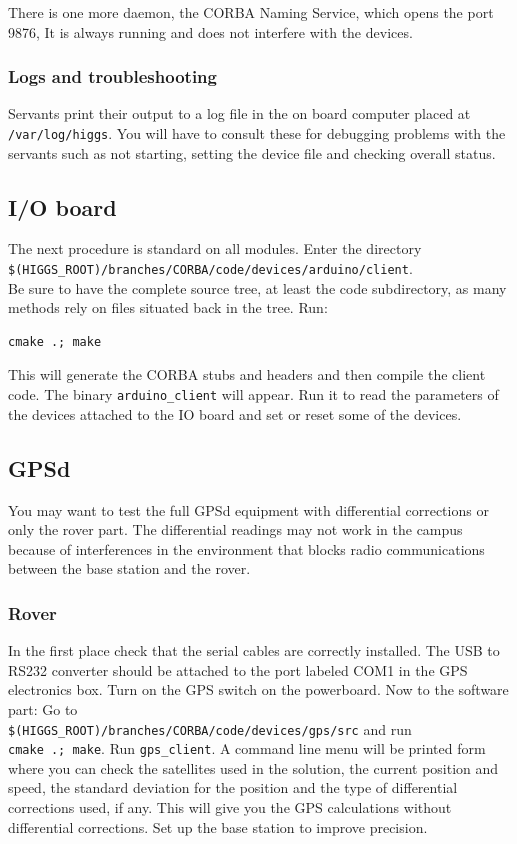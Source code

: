 There is one more daemon, the CORBA Naming Service, which opens the port 9876, It is always running and does not interfere with the devices.

\subsubsection{Logs and troubleshooting}
\label{sec:user_log}
Servants print their output to a log file in the on board computer placed at \texttt{/var/log/higgs}. You will have to consult these for debugging problems with the servants such as not starting, setting the device file and checking overall status.

\subsection{I/O board}
The next procedure is standard on all modules.
Enter the directory \\ \texttt{\$(HIGGS\_ROOT)/branches/CORBA/code/devices/arduino/client}.\\
Be sure to have the complete source tree, at least the code subdirectory, as many methods rely on files situated back in the tree.
Run:
\begin{verbatim}
cmake .; make
\end{verbatim}
This will generate the CORBA stubs and headers and then compile the client code. The binary \texttt{arduino\_client} will appear. Run it to read the parameters of the devices attached to the I\/O board and set or reset some of the devices.

\subsection{GPSd}
You may want to test the full GPSd equipment with differential corrections or only the rover part. The differential readings may not work in the campus because of interferences in the environment that blocks radio communications between the base station and the rover.

\subsubsection{Rover}
In the first place check that
 the serial cables are correctly installed. The USB to RS232 converter should be attached to the port labeled COM1 in the GPS electronics box. Turn on the GPS switch on the powerboard. Now to the software part: Go to \\ \texttt{\$(HIGGS\_ROOT)/branches/CORBA/code/devices/gps/src} and run \\
\texttt{cmake .; make}. Run \texttt{gps\_client}. A command line menu will be printed form where you can check the satellites used in the solution, the current position and speed, the standard deviation for the position and the type of differential corrections used, if any.
This will give you the GPS calculations without differential corrections. Set up the base station to improve precision.

